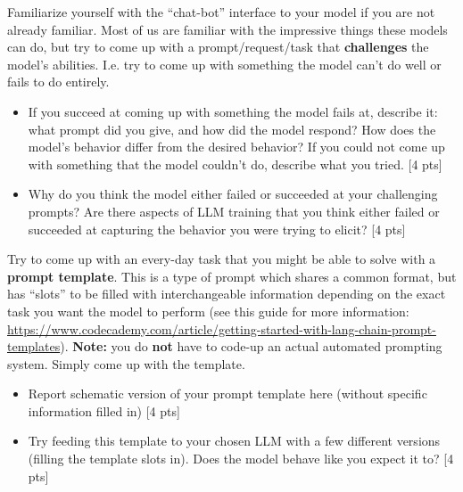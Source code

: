\documentclass[11pt]{article}
\begin{document}
\vspace{2em}
 Familiarize yourself with the ``chat-bot'' interface to your model if you are not already familiar. Most of us are familiar with the impressive things these models can do, but try to come up with a prompt/request/task that \textbf{challenges} the model's abilities. I.e. try to come up with something the model can't do well or fails to do entirely.
\begin{itemize}
  \item If you succeed at coming up with something the model fails at, describe it: what prompt did you give, and how did the model respond? How does the model's behavior differ from the desired behavior? If you could not come up with something that the model couldn't do, describe what you tried. [4 pts]
  \item Why do you think the model either failed or succeeded at your challenging prompts? Are there aspects of LLM training that you think either failed or succeeded at capturing the behavior you were trying to elicit? [4 pts]
\end{itemize}

\vspace{2em}
 Try to come up with an every-day task that you might be able to solve with a \textbf{prompt template}. This is a type of prompt which shares a common format, but has ``slots'' to be filled with interchangeable information depending on the exact task you want the model to perform (see this guide for more information: \url{https://www.codecademy.com/article/getting-started-with-lang-chain-prompt-templates}). \textbf{Note:} you do \textbf{not} have to code-up an actual automated prompting system. Simply come up with the template.
\begin{itemize}
  \item Report schematic version of your prompt template here (without specific information filled in) [4 pts]
  \item Try feeding this template to your chosen LLM with a few different versions (filling the template slots in). Does the model behave like you expect it to? [4 pts]
\end{itemize}
\end{document}
